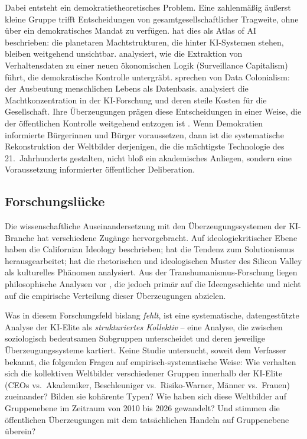 \documentclass[12pt,a4paper]{article}
\begin{document}
Dabei entsteht ein demokratietheoretisches Problem. Eine zahlenmäßig äußerst kleine Gruppe trifft Entscheidungen von gesamtgesellschaftlicher Tragweite, ohne über ein demokratisches Mandat zu verfügen. \citet{Crawford2021} hat dies als \glqq Atlas of AI\grqq{} beschrieben: die planetaren Machtstrukturen, die hinter KI-Systemen stehen, bleiben weitgehend unsichtbar. \citet{Zuboff2019} analysiert, wie die Extraktion von Verhaltensdaten zu einer neuen ökonomischen Logik (\glqq Surveillance Capitalism\grqq{}) führt, die demokratische Kontrolle untergräbt. \citet{Couldry2019} sprechen von \glqq Data Colonialism\grqq{}: der Ausbeutung menschlichen Lebens als Datenbasis. \citet{Whittaker2021} analysiert die Machtkonzentration in der KI-Forschung und deren \glqq steile Kosten\grqq{} für die Gesellschaft. Ihre Überzeugungen prägen diese Entscheidungen in einer Weise, die der öffentlichen Kontrolle weitgehend entzogen ist \citep{Floridi2019, Floridi2023}. Wenn Demokratien informierte Bürgerinnen und Bürger voraussetzen, dann ist die systematische Rekonstruktion der Weltbilder derjenigen, die die mächtigste Technologie des 21.~Jahrhunderts gestalten, nicht bloß ein akademisches Anliegen, sondern eine Voraussetzung informierter öffentlicher Deliberation.


\subsection{Forschungslücke}
\label{sec:einleitung:luecke}

Die wissenschaftliche Auseinandersetzung mit den Überzeugungssystemen der KI-Branche hat verschiedene Zugänge hervorgebracht. Auf ideologiekritischer Ebene haben \citet{BarbCam1996} die \glqq Californian Ideology\grqq{} beschrieben; \citet{Morozov2013} hat die Tendenz zum Solutionismus herausgearbeitet; \citet{Daub2020} hat die rhetorischen und ideologischen Muster des Silicon Valley als kulturelles Phänomen analysiert. Aus der Transhumanismus-Forschung liegen philosophische Analysen vor \citep{Bostrom2005, MoreVitaMore2013, Coeckelbergh2020}, die jedoch primär auf die Ideengeschichte und nicht auf die empirische Verteilung dieser Überzeugungen abzielen.

Was in diesem Forschungsfeld bislang \emph{fehlt}, ist eine systematische, datengestützte Analyse der KI-Elite als \emph{strukturiertes Kollektiv} -- eine Analyse, die zwischen soziologisch bedeutsamen Subgruppen unterscheidet und deren jeweilige Überzeugungssysteme kartiert. Keine Studie untersucht, soweit dem Verfasser bekannt, die folgenden Fragen auf empirisch-systematische Weise: Wie verhalten sich die kollektiven Weltbilder verschiedener Gruppen innerhalb der KI-Elite (CEOs vs.\ Akademiker, Beschleuniger vs.\ Risiko-Warner, Männer vs.\ Frauen) zueinander? Bilden sie kohärente Typen? Wie haben sich diese Weltbilder auf Gruppenebene im Zeitraum von 2010 bis 2026 gewandelt? Und stimmen die öffentlichen Überzeugungen mit dem tatsächlichen Handeln auf Gruppenebene überein?
\end{document}
